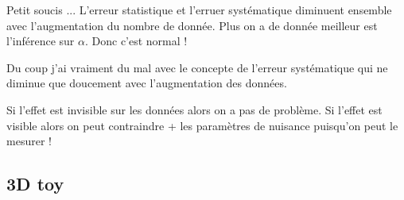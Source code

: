 Petit soucis ... L'erreur statistique et l'erruer systématique diminuent ensemble avec l'augmentation du nombre de donnée.
Plus on a de donnée meilleur est l'inférence sur $\alpha$.
Donc c'est normal !

Du coup j'ai vraiment du mal avec le concepte de l'erreur systématique qui ne diminue que doucement avec l'augmentation des données.

Si l'effet est invisible sur les données alors on a pas de problème.
Si l'effet est visible alors on peut contraindre + les paramètres de nuisance puisqu'on peut le mesurer !


\subsection{3D toy} %
\label{sub:3d_toy}



